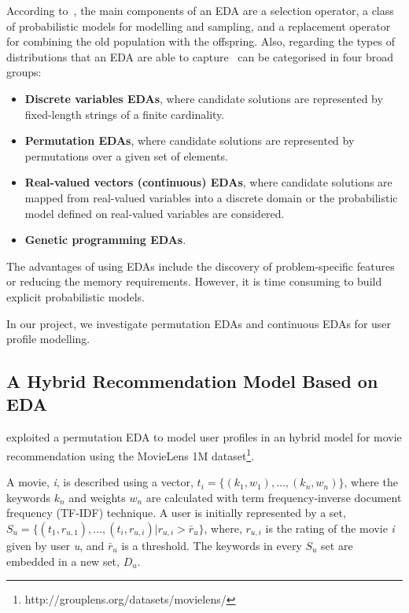 According to~\textcite{pelikan2015estimation}, the main components of an EDA are  a selection operator, a class of probabilistic models for modelling and sampling, and a replacement operator for combining the old population with the offspring. Also, regarding the types of distributions that an EDA are able to capture~\parencite{pelikan2015estimation} can be categorised in four broad groups: 
\begin{itemize}
	\item \textbf{Discrete variables EDAs}, where candidate solutions are represented by fixed-length strings of a finite cardinality.
	\item \textbf{Permutation EDAs}, where candidate solutions are represented by permutations over a given set of elements.
	\item \textbf{Real-valued vectors (continuous) EDAs}, where candidate solutions are mapped from real-valued variables into a discrete domain or the probabilistic model defined on real-valued variables are considered.
	\item \textbf{Genetic programming EDAs}.
\end{itemize}

The advantages of using EDAs include the discovery of problem-specific features or reducing the memory requirements. However, it is time consuming to build explicit probabilistic models.~\parencite{pelikan2015estimation}

In our project, we investigate permutation EDAs and continuous EDAs for user profile modelling.

\subsection{A Hybrid Recommendation Model Based on EDA}
\textcite{Liang2014781} exploited a permutation EDA to model user profiles in an hybrid model for movie recommendation using the MovieLens 1M dataset\footnote{http://grouplens.org/datasets/movielens/}.

A movie, \emph{i}, is described using a vector, $t_i=\{(k_1,w_1),\ldots ,(k_n,w_n)\}$, where the keywords $k_n$ and weights $w_n$ are calculated with term frequency-inverse document frequency (TF-IDF) technique. A user is initially represented by a set,  $S_u=\{(t_1, r_{u,1}),\ldots,(t_i, r_{u,i})\vert r_{u,i}>\bar r_{u}\}$, where, $r_{u,i}$ is the rating of the movie \emph{i} given by user \emph{u}, and $\bar r_{u}$ is a threshold. The keywords in every $S_u$ set are embedded in a new set, $D_u$.

